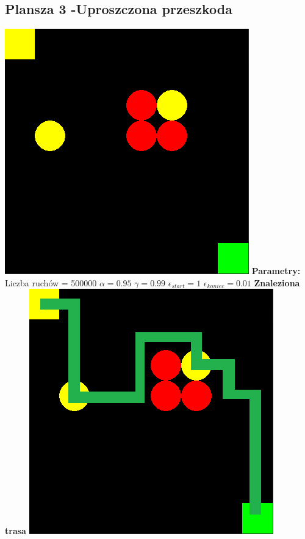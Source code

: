 \documentclass[a4paper,12pt]{article}
\begin{document}
\subsection{Plansza 3 -Uproszczona przeszkoda}
\includegraphics[scale=0.73]{testy/plansza3.png} \newline
\textbf{Parametry:}
Liczba ruchów = 500000
\newline \(\alpha = 0.95\)
\newline \(\gamma = 0.99\)
\newline \(\epsilon_{start} = 1\)
\newline \(\epsilon_{koniec} = 0.01\) \newline \newline
\textbf{\Large{Znaleziona trasa}} \newline \newline
\includegraphics[scale=0.73]{testy/plansza3trasa.png} \newline \newline
\end{document}
